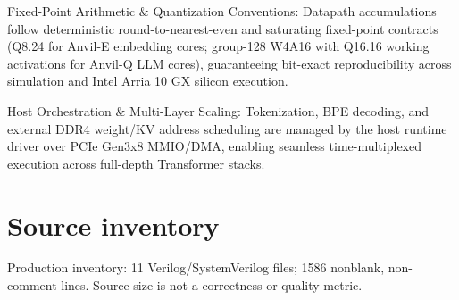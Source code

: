\documentclass[11pt,a4paper]{article}
\begin{document}
Fixed-Point Arithmetic \& Quantization Conventions: Datapath accumulations follow deterministic round-to-nearest-even and saturating fixed-point contracts (\allowbreak{}Q8.24 for Anvil-E embedding cores; group-128 W4A16 with Q16.16 working activations for Anvil-Q LLM cores)\allowbreak{},\allowbreak{} guaranteeing bit-exact reproducibility across simulation and Intel Arria 10 GX silicon execution.


Host Orchestration \& Multi-Layer Scaling: Tokenization,\allowbreak{} BPE decoding,\allowbreak{} and external DDR4 weight/\allowbreak{}KV address scheduling are managed by the host runtime driver over PCIe Gen3x8 MMIO/\allowbreak{}DMA,\allowbreak{} enabling seamless time-multiplexed execution across full-depth Transformer stacks.


\appendix{}\section{Source inventory}

Production inventory: 11 Verilog/\allowbreak{}SystemVerilog files; 1586 nonblank,\allowbreak{} non-comment lines. Source size is not a correctness or quality metric.
\end{document}

